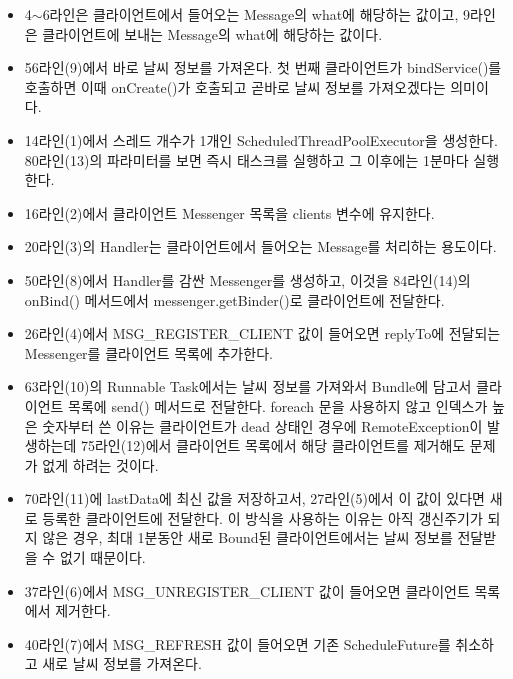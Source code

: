 \begin{itemize}
\item 4$\sim$6라인은 클라이언트에서 들어오는 Message의 what에 해당하는 값이고, 9라인은 클라이언트에 보내는 Message의 what에 해당하는 값이다.
\item 56라인(9)에서 바로 날씨 정보를 가져온다. 첫 번째 클라이언트가 bindService()를 호출하면 이때 onCreate()가 호출되고 곧바로 날씨 정보를 가져오겠다는 의미이다.
\item 14라인(1)에서 스레드 개수가 1개인 ScheduledThreadPoolExecutor을 생성한다. 80라인(13)의 파라미터를 보면 즉시 태스크를 실행하고 그 이후에는 1분마다 실행한다.
\item 16라인(2)에서 클라이언트 Messenger 목록을 clients 변수에 유지한다.
\item 20라인(3)의 Handler는 클라이언트에서 들어오는 Message를 처리하는 용도이다.
\item 50라인(8)에서 Handler를 감싼 Messenger를 생성하고, 이것을 84라인(14)의 onBind() 메서드에서 messenger.getBinder()로 클라이언트에 전달한다.
\item 26라인(4)에서 MSG\_REGISTER\_CLIENT 값이 들어오면 replyTo에 전달되는 Messenger를 클라이언트 목록에 추가한다.
\item 63라인(10)의 Runnable Task에서는 날씨 정보를 가져와서 Bundle에 담고서 클라이언트 목록에 send() 메서드로 전달한다. foreach 문을 사용하지 않고 인덱스가 높은 숫자부터 쓴 이유는 클라이언트가 dead 상태인 경우에 RemoteException이 발생하는데 75라인(12)에서 클라이언트 목록에서 해당 클라이언트를 제거해도 문제가 없게 하려는 것이다.
\item 70라인(11)에 lastData에 최신 값을 저장하고서, 27라인(5)에서 이 값이 있다면 새로 등록한 클라이언트에 전달한다. 이 방식을 사용하는 이유는 아직 갱신주기가 되지 않은 경우, 최대 1분동안 새로 Bound된 클라이언트에서는 날씨 정보를 전달받을 수 없기 때문이다.
\item 37라인(6)에서 MSG\_UNREGISTER\_CLIENT 값이 들어오면 클라이언트 목록에서 제거한다.
\item 40라인(7)에서 MSG\_REFRESH 값이 들어오면 기존 ScheduleFuture를 취소하고 새로 날씨 정보를 가져온다.
\end{itemize}

